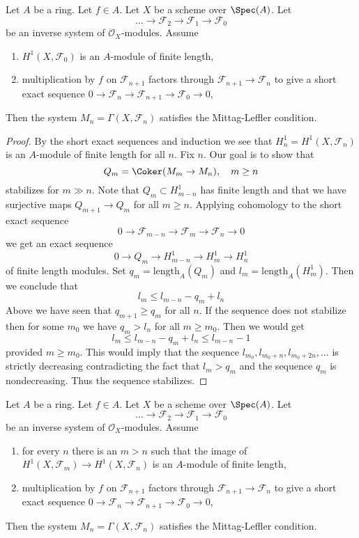 \begin{lemma}
\label{lemma-ML}
Let $A$ be a ring. Let $f \in A$. Let $X$ be a scheme over $\Spec(A)$. Let
$$
\ldots \to \mathcal{F}_2 \to \mathcal{F}_1 \to \mathcal{F}_0
$$
be an inverse system of $\mathcal{O}_X$-modules. Assume
\begin{enumerate}
\item $H^1(X, \mathcal{F}_0)$ is an $A$-module of finite length,
\item multiplication by $f$ on $\mathcal{F}_{n + 1}$ factors
through $\mathcal{F}_{n + 1} \to \mathcal{F}_n$ to give a
short exact sequence
$0 \to \mathcal{F}_n \to \mathcal{F}_{n + 1} \to \mathcal{F}_0 \to 0$,
\end{enumerate}
Then the system $M_n = \Gamma(X, \mathcal{F}_n)$ satisfies the
Mittag-Leffler condition.
\end{lemma}

\begin{proof}
By the short exact sequences and induction we see that
$H^1_n = H^1(X, \mathcal{F}_n)$ is an $A$-module of finite
length for all $n$. Fix $n$. Our goal is to show that
$$
Q_m = \Coker(M_m \to M_n),\quad m \geq n
$$
stabilizes for $m \gg n$. Note that $Q_m \subset H^1_{m - n}$ has finite length
and that we have surjective maps $Q_{m + 1} \to Q_m$ for all $m \geq n$.
Applying cohomology to the short exact sequence
$$
0 \to \mathcal{F}_{m - n} \to \mathcal{F}_m \to \mathcal{F}_n \to 0
$$
we get an exact sequence
$$
0 \to Q_m \to H^1_{m - n} \to H^1_m \to H^1_n
$$
of finite length modules.
Set $q_m = \text{length}_A(Q_m)$ and $l_m = \text{length}_A(H^1_m)$.
Then we conclude that
$$
l_m \leq l_{m - n} - q_m + l_n
$$
Above we have seen that $q_{m + 1} \geq q_m$ for all $n$. If the sequence
does not stabilize then for some $m_0$ we have $q_m > l_n$ for all
$m \geq m_0$. Then we would get
$$
l_m \leq l_{m - n} - q_m + l_n \leq l_{m - n} - 1
$$
provided $m \geq m_0$. This would imply that the sequence
$l_{m_0}, l_{m_0 + n}, l_{m_0 + 2n}, \ldots$ is strictly decreasing
contradicting the fact that $l_m > q_m$ and the sequence $q_m$
is nondecreasing. Thus the sequence stabilizes.
\end{proof}

\begin{lemma}
\label{lemma-ML-better}
Let $A$ be a ring. Let $f \in A$. Let $X$ be a scheme over $\Spec(A)$. Let
$$
\ldots \to \mathcal{F}_2 \to \mathcal{F}_1 \to \mathcal{F}_0
$$
be an inverse system of $\mathcal{O}_X$-modules. Assume
\begin{enumerate}
\item for every $n$ there is an $m > n$ such that the image of
$H^1(X, \mathcal{F}_m) \to H^1(X, \mathcal{F}_n)$
is an $A$-module of finite length,
\item multiplication by $f$ on $\mathcal{F}_{n + 1}$ factors
through $\mathcal{F}_{n + 1} \to \mathcal{F}_n$ to give a
short exact sequence
$0 \to \mathcal{F}_n \to \mathcal{F}_{n + 1} \to \mathcal{F}_0 \to 0$,
\end{enumerate}
Then the system $M_n = \Gamma(X, \mathcal{F}_n)$ satisfies the
Mittag-Leffler condition.
\end{lemma}

